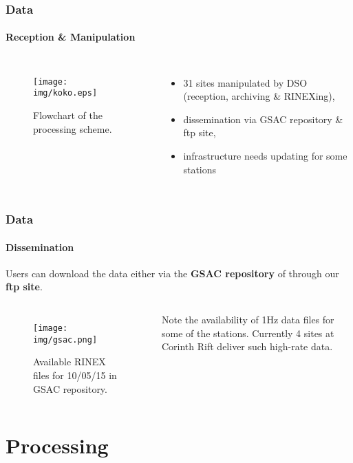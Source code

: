 \documentclass{beamer}
\begin{document}
\begin{frame}\frametitle{Data}\framesubtitle{Reception \& Manipulation}

  \begin{columns}
    \begin{figure}
        \begin{center}
        \texttt{[image: img/koko.eps]}
        \caption{Flowchart of the processing scheme.}
        \label{fig:dgrm}
        \end{center}
    \end{figure}
        \begin{itemize}
        \item 31 sites manipulated by DSO (reception, archiving \& RINEXing),
        \item dissemination via GSAC repository \& ftp site,
        \item infrastructure needs updating for some stations
    \end{itemize}
\end{columns}

\end{frame}

\begin{frame}\frametitle{Data}\framesubtitle{Dissemination}

    Users can download the data either via the \textbf{GSAC repository} of through our \textbf{ftp site}.

  \begin{columns}
    \begin{figure}
        \begin{center}
        \texttt{[image: img/gsac.png]}
        \caption{Available RINEX files for 10/05/15 in GSAC repository.}
        \label{fig:mits}
        \end{center}
    \end{figure}
    Note the availability of 1Hz data files for some of the stations. Currently 4 sites at Corinth Rift
    deliver such high-rate data.
  \end{columns}

\end{frame}

\section{Processing}
\end{document}
